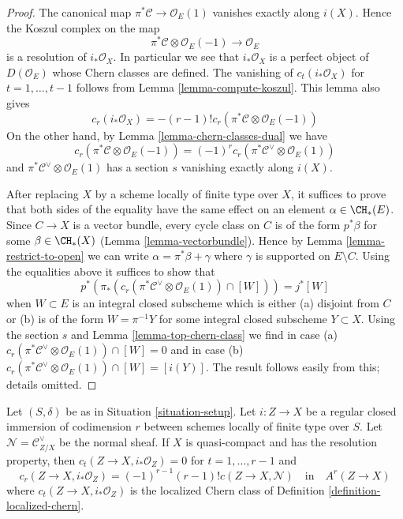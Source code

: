 \begin{proof}
The canonical map $\pi^*\mathcal{C} \to \mathcal{O}_E(1)$ vanishes
exactly along $i(X)$. Hence the Koszul complex on the map
$$
\pi^*\mathcal{C} \otimes \mathcal{O}_E(-1) \to \mathcal{O}_E
$$
is a resolution of $i_*\mathcal{O}_X$. In particular we see that
$i_*\mathcal{O}_X$ is a perfect object of $D(\mathcal{O}_E)$
whose Chern classes are defined. The vanishing of $c_t(i_*\mathcal{O}_X)$
for $t = 1, \ldots, t - 1$ follows from Lemma \ref{lemma-compute-koszul}.
This lemma also gives
$$
c_r(i_*\mathcal{O}_X) = - (r - 1)!
c_r(\pi^*\mathcal{C} \otimes \mathcal{O}_E(-1))
$$
On the other hand, by Lemma \ref{lemma-chern-classes-dual} we have
$$
c_r(\pi^*\mathcal{C} \otimes \mathcal{O}_E(-1)) =
(-1)^r c_r(\pi^*\mathcal{C}^\vee \otimes \mathcal{O}_E(1))
$$
and $\pi^*\mathcal{C}^\vee \otimes \mathcal{O}_E(1)$ has a section $s$
vanishing exactly along $i(X)$.

\medskip\noindent
After replacing $X$ by a scheme locally of finite type over $X$,
it suffices to prove that both sides of the equality have the
same effect on an element $\alpha \in \CH_*(E)$. Since $C \to X$
is a vector bundle, every cycle class on $C$ is of the form $p^*\beta$
for some $\beta \in \CH_*(X)$ (Lemma \ref{lemma-vectorbundle}).
Hence by Lemma \ref{lemma-restrict-to-open}
we can write $\alpha = \pi^*\beta + \gamma$ where $\gamma$
is supported on $E \setminus C$. Using the equalities above
it suffices to show that
$$
p^*(\pi_*(c_r(\pi^*\mathcal{C}^\vee \otimes \mathcal{O}_E(1)) \cap [W])) =
j^*[W]
$$
when $W \subset E$ is an integral closed subscheme which
is either (a) disjoint from $C$ or (b) is of the form $W = \pi^{-1}Y$
for some integral closed subscheme $Y \subset X$.
Using the section $s$ and Lemma \ref{lemma-top-chern-class} we find
in case (a) $c_r(\pi^*\mathcal{C}^\vee \otimes \mathcal{O}_E(1)) \cap [W] = 0$
and in case (b)
$c_r(\pi^*\mathcal{C}^\vee \otimes \mathcal{O}_E(1)) \cap [W] = [i(Y)]$.
The result follows easily from this; details omitted.
\end{proof}

\begin{lemma}
\label{lemma-agreement-with-loc-chern}
Let $(S, \delta)$ be as in Situation \ref{situation-setup}. Let $i : Z \to X$
be a regular closed immersion of codimension $r$
between schemes locally of finite type over $S$.
Let $\mathcal{N} = \mathcal{C}_{Z/X}^\vee$ be the normal sheaf. If $X$
is quasi-compact and has the resolution property, then
$c_t(Z \to X, i_*\mathcal{O}_Z) = 0$ for $t = 1, \ldots, r - 1$ and
$$
c_r(Z \to X, i_*\mathcal{O}_Z) = (-1)^{r - 1} (r - 1)! c(Z \to X, \mathcal{N})
\quad\text{in}\quad
A^r(Z \to X)
$$
where $c_t(Z \to X, i_*\mathcal{O}_Z)$
is the localized Chern class
of Definition \ref{definition-localized-chern}.
\end{lemma}

